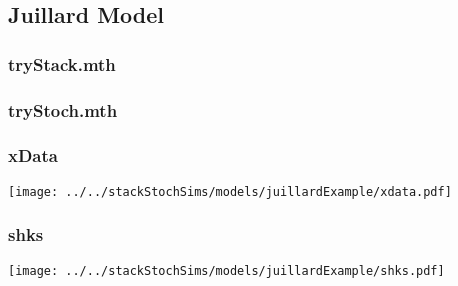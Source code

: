 \documentclass[12pt]{article}
\begin{document}
\subsection{Juillard Model}
\label{sec:juillard-model-}

\subsubsection{tryStack.mth}
\label{sec:trystack.mth}



\subsubsection{tryStoch.mth}
\label{sec:trystack.mth}



\subsubsection{xData}
\label{sec:xdata}

\texttt{[image: ../../stackStochSims/models/juillardExample/xdata.pdf]}

\subsubsection{shks}
\label{sec:xdata}

\texttt{[image: ../../stackStochSims/models/juillardExample/shks.pdf]}
\end{document}

